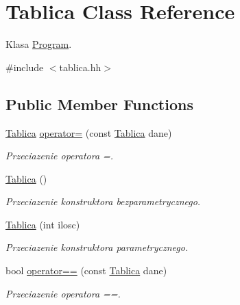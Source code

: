 \hypertarget{class_tablica}{\section{Tablica Class Reference}
\label{class_tablica}
}


Klasa \hyperlink{class_program}{Program}.  




{\ttfamily \#include $<$tablica.\+hh$>$}

\subsection*{Public Member Functions}
\begin{DoxyCompactItemize}
\item 
\hyperlink{class_tablica}{Tablica} \hyperlink{class_tablica_a2d776cbdc02ed70b045b2c680bfdb695}{operator=} (const \hyperlink{class_tablica}{Tablica} dane)
\begin{DoxyCompactList}\small\item\em Przeciazenie operatora =. \end{DoxyCompactList}\item 
\hypertarget{class_tablica_a5f484e7b0478e1ff9b62e894f9d7b28d}{\hyperlink{class_tablica_a5f484e7b0478e1ff9b62e894f9d7b28d}{Tablica} ()}\label{class_tablica_a5f484e7b0478e1ff9b62e894f9d7b28d}

\begin{DoxyCompactList}\small\item\em Przeciazenie konstruktora bezparametrycznego. \end{DoxyCompactList}\item 
\hypertarget{class_tablica_aee4b66a81059b6ef1881909cd9f344b4}{\hyperlink{class_tablica_aee4b66a81059b6ef1881909cd9f344b4}{Tablica} (int ilosc)}\label{class_tablica_aee4b66a81059b6ef1881909cd9f344b4}

\begin{DoxyCompactList}\small\item\em Przeciazenie konstruktora parametrycznego. \end{DoxyCompactList}\item 
bool \hyperlink{class_tablica_a3864d3f5d0a339a496136e3546e71759}{operator==} (const \hyperlink{class_tablica}{Tablica} dane)
\begin{DoxyCompactList}\small\item\em Przeciazenie operatora ==. \end{DoxyCompactList}\end{DoxyCompactItemize}
